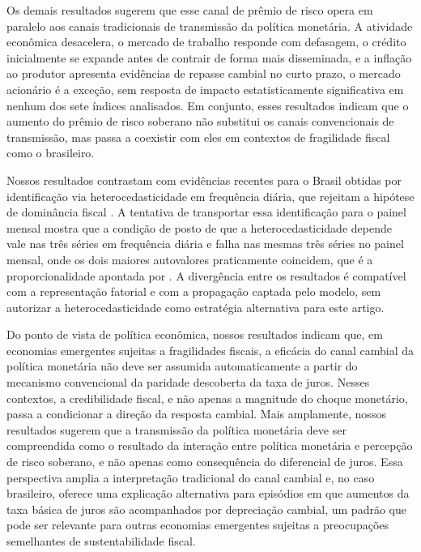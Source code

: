 \documentclass[preprint,authoryear,review,12pt]{elsarticle}
\begin{document}
Os demais resultados sugerem que esse canal de prêmio de risco opera em paralelo aos canais tradicionais de transmissão da política monetária. A atividade econômica desacelera, o mercado de trabalho responde com defasagem, o crédito inicialmente se expande antes de contrair de forma mais disseminada, e a inflação ao produtor apresenta evidências de repasse cambial no curto prazo, o mercado acionário é a exceção, sem resposta de impacto estatisticamente significativa em nenhum dos sete índices analisados. Em conjunto, esses resultados indicam que o aumento do prêmio de risco soberano não substitui os canais convencionais de transmissão, mas passa a coexistir com eles em contextos de fragilidade fiscal como o brasileiro.

Nossos resultados contrastam com evidências recentes para o Brasil obtidas por identificação via heterocedasticidade em frequência diária, que rejeitam a hipótese de dominância fiscal \citep[]{goncalves2025}. A tentativa de transportar essa identificação para o painel mensal mostra que a condição de posto de que a heterocedasticidade depende vale nas três séries em frequência diária e falha nas mesmas três séries no painel mensal, onde os dois maiores autovalores praticamente coincidem, que é a proporcionalidade apontada por \cite{rigobon2003}. A divergência entre os resultados é compatível com a representação fatorial e com a propagação captada pelo modelo, sem autorizar a heterocedasticidade como estratégia alternativa para este artigo.

Do ponto de vista de política econômica, nossos resultados indicam que, em economias emergentes sujeitas a fragilidades fiscais, a eficácia do canal cambial da política monetária não deve ser assumida automaticamente a partir do mecanismo convencional da paridade descoberta da taxa de juros. Nesses contextos, a credibilidade fiscal, e não apenas a magnitude do choque monetário, passa a condicionar a direção da resposta cambial. Mais amplamente, nossos resultados sugerem que a transmissão da política monetária deve ser compreendida como o resultado da interação entre política monetária e percepção de risco soberano, e não apenas como consequência do diferencial de juros. Essa perspectiva amplia a interpretação tradicional do canal cambial e, no caso brasileiro, oferece uma explicação alternativa para episódios em que aumentos da taxa básica de juros são acompanhados por depreciação cambial, um padrão que pode ser relevante para outras economias emergentes sujeitas a preocupações semelhantes de sustentabilidade fiscal.
\end{document}
